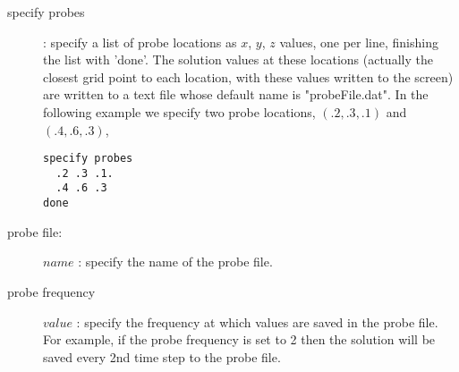 \documentclass[11pt]{article}
\begin{document}
\begin{description}
  \item [\qquad specify probes] : specify a list of probe locations as $x$, $y$, $z$ values, one per line, finishing the
         list with 'done'. The solution values at these locations (actually the closest grid point to each location, with these
         values written to the screen) are
    written to a text file whose default name is "probeFile.dat". 
    In the following example we specify two probe locations, $(.2,.3,.1)$ and $(.4,.6,.3)$, 
\begin{verbatim}
specify probes
  .2 .3 .1.
  .4 .6 .3
done
\end{verbatim}
  \item [\qquad probe file:] $name$ : specify the name of the probe file.
  \item [\qquad probe frequency] $value$ : specify the frequency at which values are saved in the probe file. For example,
      if the probe frequency is set to 2 then the solution will be saved every 2nd time step to the probe file. 
\end{description}





\vfill\eject



\printindex
\end{document}

